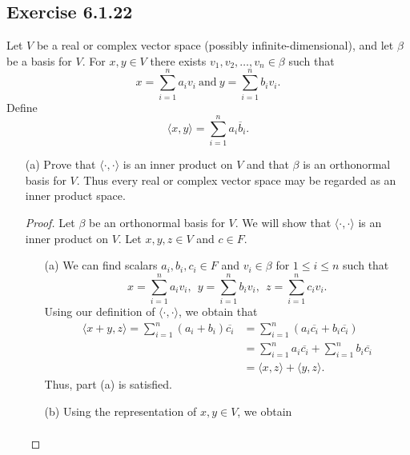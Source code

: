 \subsection*{Exercise 6.1.22} Let \( V  \) be a real or complex vector space (possibly infinite-dimensional), and let \( \beta \) be a basis for \( V  \). For \( x,y \in V  \) there exists \( {v}_{1}, {v}_{2}, \dots, {v}_{n} \in \beta  \) such that
\[  x = \sum_{ i=1  }^{ n  } {a}_{i} {v}_{i} \ \text{and} \ y = \sum_{ i=1  }^{ n } {b}_{i} {v}_{i}. \]
Define 
\[  \langle x , y \rangle = \sum_{ i=1  }^{ n } {a}_{i}\overline{b}_{i}. \]
\begin{enumerate}
    \item[(a)] Prove that \( \langle \cdot  ,  \cdot  \rangle \) is an inner product on \( V  \) and that \( \beta  \) is an orthonormal basis for \( V  \). Thus every real or complex vector space may be regarded as an inner product space.
        \begin{proof}
        Let \( \beta \) be an orthonormal basis for \( V  \). We will show that \( \langle \cdot  , \cdot  \rangle  \) is an inner product on \( V  \). Let \( x,y,z \in V  \) and \( c \in F  \). 
        \begin{enumerate}
            \item[(a)] We can find scalars \( {a}_{i}, {b}_{i}, {c}_{i} \in F  \) and \( {v}_{i} \in \beta  \) for \( 1 \leq i \leq n  \) such that 
                \[  x = \sum_{ i=1  }^{ n  } {a}_{i} {v}_{i},  \ \  y = \sum_{ i=1  }^{ n } {b}_{i} {v}_{i},  \ \ z = \sum_{ i=1  }^{ n } {c}_{i} {v}_{i}. \]
                Using our definition of \( \langle \cdot  ,  \cdot \rangle \), we obtain that
                \begin{align*}
                    \langle x + y  , z  \rangle = \sum_{ i=1  }^{ n  } ({a}_{i} + {b}_{i}) \overline{{c}_{i}}  
                                                &= \sum_{ i=1  }^{ n  } ({a}_{i} \overline{{c}_{i}} + {b}_{i} \overline{{c}_{i}}) \\
                                                &= \sum_{ i=1  }^{ n  } {a}_{i} \overline{{c}_{i}} + \sum_{ i=1  }^{ n } {b}_{i} \overline{{c}_{i}} \\
                                                &= \langle x , z \rangle + \langle y , z \rangle.
                \end{align*}
                Thus, part (a) is satisfied.
            \item[(b)] Using the representation of \( x,y \in V  \), we obtain
                \begin{align*}

\end{align*}
\end{enumerate}
\end{proof}
\end{enumerate}
